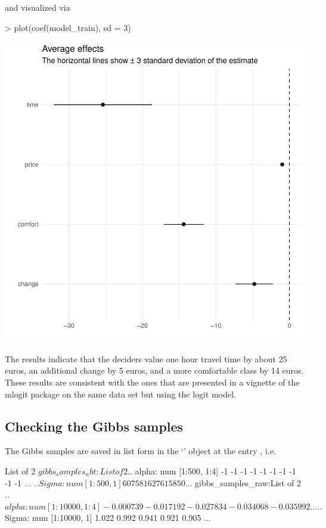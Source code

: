 \documentclass[article]{jss}
\newcommand{\class}[1]{`\code{#1}'}
\begin{document}
and visualized via

\begin{Schunk}
\begin{Sinput}
> plot(coef(model_train), sd = 3)
\end{Sinput}
\end{Schunk}
\includegraphics{rprobitb_oelschlaeger_bauer-plot-coef-model-train}

The results indicate that the deciders value one hour travel time by about 25 euros, an additional change by 5 euros, and a more comfortable class by 14 euros. These results are consistent with the ones that are presented in a vignette of the mlogit package on the same data set but using the logit model.

\subsection{Checking the Gibbs samples} \label{subsec:checking-gibbs-samples}

The Gibbs samples are saved in list form in the \class{RprobitB\_fit} object at the entry , i.e.

\begin{Schunk}
\begin{Soutput}
List of 2
 $ gibbs_samples_nbt:List of 2
  ..$ alpha: num [1:500, 1:4] -1 -1 -1 -1 -1 -1 -1 -1 -1 -1 ...
  ..$ Sigma: num [1:500, 1] 607 581 627 615 850 ...
 $ gibbs_samples_raw:List of 2
  ..$ alpha: num [1:10000, 1:4] -0.000739 -0.017192 -0.027834 -0.034068 -0.035992 ...
  ..$ Sigma: num [1:10000, 1] 1.022 0.992 0.941 0.921 0.905 ...
\end{Soutput}
\end{Schunk}
\end{document}
